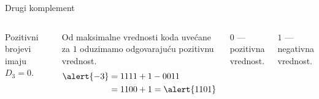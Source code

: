 \begin{frame}[label=04-s032]{Drugi komplement}
\begin{columns}[c,onlytextwidth]
\centering
{\fontsize{9}{10}\selectfont\renewcommand{\arraystretch}{.82}\setlength{\tabcolsep}{4pt}\par}
Pozitivni brojevi imaju $D_3=0$.\par\vspace{3mm}
Od maksimalne vrednosti koda uvećane za $1$ oduzimamo odgovarajuću pozitivnu vrednost.
\[\begin{aligned}\alert{-3}&=1111+1-0011\\&=1100+1=\alert{1101}\end{aligned}\]
\par\vspace{3mm}
$0$ — pozitivna vrednost.\par
$1$ — negativna vrednost.
\end{columns}
\end{frame}
